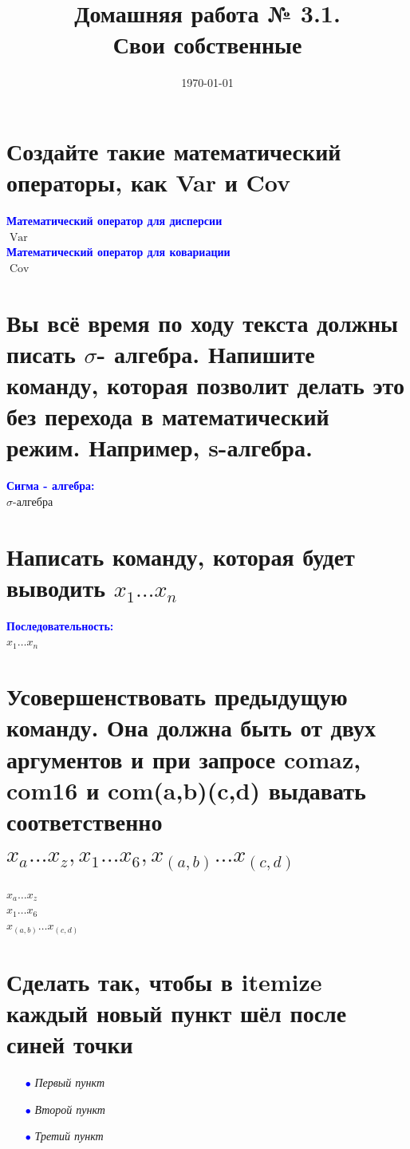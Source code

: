 \documentclass[12pt, a4paper]{article}
\title{Домашняя работа № 3.1.\\ Свои собственные}
\date{\today}
\DeclareMathOperator{\Var}{Var}
\DeclareMathOperator{\Cov}{Cov}
\begin{document}
\maketitle

\section{Создайте такие математический операторы, как Var и Cov}
\Large{\textbf{\textcolor{blue}{Математический оператор для дисперсии}}} \\
\Large{$\Var$}\\
\textbf{\textcolor{blue}{Математический оператор для ковариации}} \\
\Large{$\Cov$}

\section{Вы всё время по ходу текста должны писать $\sigma$-
алгебра. Напишите команду, которая позволит делать это без
перехода в математический режим. Например, s-алгебра.}
\Large{\textbf{\textcolor{blue}{Сигма - алгебра:}}}\\
\def\s{\ensuremath{\sigma}}
\s-алгебра

\section{Написать команду, которая будет выводить $x_1 \ldots x_n$}
\Large{\textbf{\textcolor{blue}{Последовательность:}}} \\
\newcommand{\vect}{\ensuremath{x_1 \ldots x_n}}
\vect

\section{Усовершенствовать предыдущую команду. Она должна быть
от двух аргументов и при запросе com{a}{z}, com{1}{6} и
com{(a,b)}{(c,d)} выдавать соответственно 
$x_a \ldots x_z, 
x_1 \ldots x_6, 
x_{(a,b)} \ldots x_{(c,d)}$}
\newcommand{\com}[2]{\ensuremath{x_#1 \ldots x_#2}}
\com{a}{z}\\
\com{1}{6}\\
\com{{(a,b)}}{{(c,d)}}

\section{ Сделать так, чтобы в itemize каждый новый пункт шёл после синей точки}


\begin{itemize}
\item [\textcolor{blue}{$\bullet$}]\textit{Первый пункт}
\item [\textcolor{blue}{$\bullet$}]\textit{Второй пункт}
\item [\textcolor{blue}{$\bullet$}]\textit{Третий пункт}
\end{itemize}
\end{document}
